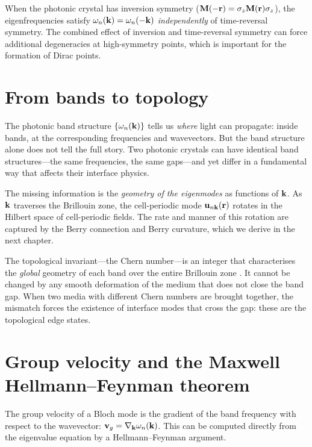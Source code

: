When the photonic crystal has inversion symmetry
($\mathbf{M}(-\mathbf{r})=\sigma_z\mathbf{M}(\mathbf{r})\sigma_z$), the eigenfrequencies
satisfy $\omega_n(\mathbf{k})=\omega_n(-\mathbf{k})$ \emph{independently} of
time-reversal symmetry.  The combined effect of inversion and
time-reversal symmetry can force additional degeneracies at
high-symmetry points, which is important for the formation of
Dirac points.

\section{From bands to topology}
\label{sec:ch4-bands-to-topology}

The photonic band structure $\{\omega_n(\mathbf{k})\}$ tells us
\emph{where} light can propagate: inside bands, at the corresponding
frequencies and wavevectors.  But the band structure alone does not tell
the full story.  Two photonic crystals can have identical band
structures---the same frequencies, the same gaps---and yet differ in a
fundamental way that affects their interface physics.

The missing information is the \emph{geometry of the eigenmodes} as
functions of $\mathbf{k}$.  As $\mathbf{k}$ traverses the Brillouin zone, the
cell-periodic mode $\mathbf{u}_{n\mathbf{k}}(\mathbf{r})$ rotates in the
Hilbert space of cell-periodic fields.  The rate and manner of this
rotation are captured by the Berry connection and Berry curvature,
which we derive in the next chapter.

The topological invariant---the Chern number---is an integer that
characterises the \emph{global} geometry of each band over the entire
Brillouin zone \cite{thouless1982quantized}.  It cannot be changed by any smooth deformation of the
medium that does not close the band gap.  When two media with different
Chern numbers are brought together, the mismatch forces the existence
of interface modes that cross the gap: these are the topological edge
states.

\section{Group velocity and the Maxwell Hellmann--Feynman theorem}
\label{sec:ch4-group-velocity}

The group velocity of a Bloch mode is the gradient of the band
frequency with respect to the wavevector:
$\mathbf{v}_g=\nabla_{\mathbf{k}}\omega_n(\mathbf{k})$.  This can be computed
directly from the eigenvalue equation by a Hellmann--Feynman argument.

